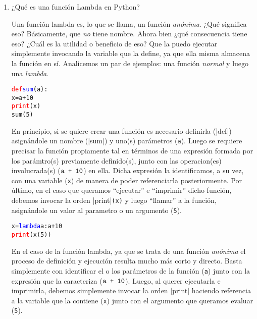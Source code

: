 \documentclass{article}
\begin{document}
\begin{enumerate}
\item ¿Qué es una función Lambda en Python?
\par \hspace{5pt} Una función lambda es, lo que se llama, un función \emph{anónima}. ¿Qué significa eso? Básicamente, que \emph{no} tiene nombre. Ahora bien ¿qué consecuencia tiene eso? ¿Cuál es la utilidad o beneficio de eso? Que la puedo ejecutar simplemente invocando la variable que la define, ya que ella misma almacena la función en sí. Analicemos un par de ejemplos: una función \emph{normal} y luego una \emph{lambda}.
\begin{tcolorbox}
\begin{alltt}
\textcolor{red}{def} \textcolor{blue}{sum}(a):
    x = a + 10
    \textcolor{red}{print}(x)
sum(5)
\end{alltt}        
\end{tcolorbox}
\par \hspace{5pt} En principio, si se quiere crear una función es necesario  definirla (\rverb|def|) asignándole un nombre (\bverb|sum|) y uno(s) parámetros (\verb|a|). Luego se requiere precisar la función propiamente tal en términos de una expresión formada por los parámtro(s) previamente definido(s), junto con las operacion(es) involucrada(s) ($\verb|a + 10|$) en ella. Dicha expresión la identificamos, a su vez, con una variable (\verb|x|) de manera de poder referenciarla posteriormente. Por último, en el caso que queramos ``ejecutar'' e ``imprimir'' dicho función, debemos invocar la orden \rverb|print|\verb|(x)| y luego ``llamar'' a la función, asignándole un valor al parametro o un argumento (\verb|5|). 
\begin{tcolorbox}
\begin{alltt}
x = \textcolor{blue}{lambda} a : a + 10
\textcolor{red}{print}(x(5))
\end{alltt}        
\end{tcolorbox}
\par \hspace{5pt} En el caso de la función lambda, ya que se trata de una función \emph{anónima} el proceso de definición y ejecución resulta mucho más corto y directo. Basta simplemente con identificar el o los parámetros de la función (\verb|a|) junto con la expresión que la caracteriza ($\verb|a + 10|$). Luego, al querer ejecutarla e imprimirla, debemos simplemente invocar la orden \rverb|print| haciendo referencia a la variable que la contiene (\verb|x|) junto con el argumento que queramos evaluar (\verb|5|).
\vspace{0.5cm}
  

\end{enumerate}
\end{document}
